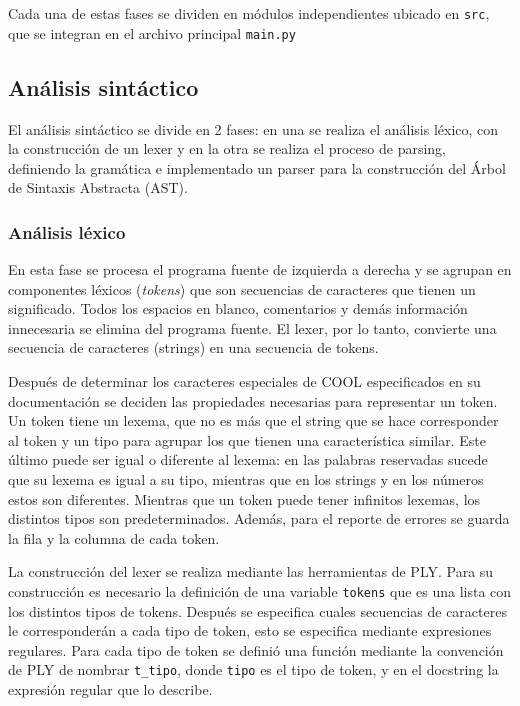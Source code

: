 \documentclass[11pt]{scrartcl} %
\begin{document}
Cada una de estas fases se dividen en módulos independientes ubicado en \texttt{src}, que se integran en el archivo principal \texttt{main.py}

\subsection{Análisis sintáctico}

El análisis sintáctico se divide en 2 fases: en una se realiza el análisis léxico, con la construcción de un lexer y en la otra se realiza el proceso de parsing, definiendo la gramática e implementado un parser para la construcción del Árbol de Sintaxis Abstracta (AST).

\subsubsection{Análisis léxico}

En esta fase se procesa el programa fuente de izquierda a derecha y se agrupan en componentes léxicos (\textit{tokens}) que son secuencias de caracteres que tienen un significado. Todos los espacios en blanco, comentarios y demás información innecesaria se elimina del programa fuente. El lexer, por lo tanto, convierte una secuencia de caracteres (strings) en una secuencia de tokens.

Después de determinar los caracteres especiales de COOL especificados en su documentación se deciden las propiedades necesarias para representar un token. Un token tiene un lexema, que no es más que el string que se hace corresponder al token y un tipo para agrupar los que tienen una característica similar. Este último puede ser igual o diferente al lexema: en las palabras reservadas sucede que su lexema es igual a su tipo, mientras que en los strings y en los números estos son diferentes. Mientras que un token puede tener infinitos lexemas, los distintos tipos son predeterminados. Además, para el reporte de errores se guarda la fila y la columna de cada token.

La construcción del lexer se realiza mediante las herramientas de PLY. Para su construcción es necesario la definición de una variable \texttt{tokens} que es una lista con los distintos tipos de tokens. Después se especifica cuales secuencias de caracteres le corresponderán a cada tipo de token, esto se especifica mediante expresiones regulares. Para cada tipo de token se definió una función mediante la convención de PLY de nombrar \texttt{t\_tipo}, donde \texttt{tipo} es el tipo de token, y en el docstring la expresión regular que lo describe.
\end{document}
